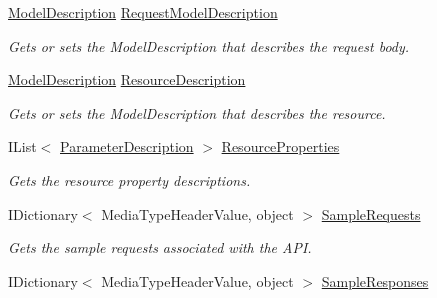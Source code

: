 \begin{DoxyCompactItemize}
\hyperlink{classApi3Layers_1_1Areas_1_1HelpPage_1_1ModelDescriptions_1_1ModelDescription}{Model\+Description} \hyperlink{classApi3Layers_1_1Areas_1_1HelpPage_1_1Models_1_1HelpPageApiModel_a014cdaab9901575d2ad288db94d49d49}{Request\+Model\+Description}
\begin{DoxyCompactList}\small\item\em Gets or sets the Model\+Description that describes the request body. \end{DoxyCompactList}\item 
\hyperlink{classApi3Layers_1_1Areas_1_1HelpPage_1_1ModelDescriptions_1_1ModelDescription}{Model\+Description} \hyperlink{classApi3Layers_1_1Areas_1_1HelpPage_1_1Models_1_1HelpPageApiModel_aac9145223442cf500f314efff3ba18a6}{Resource\+Description}
\begin{DoxyCompactList}\small\item\em Gets or sets the Model\+Description that describes the resource. \end{DoxyCompactList}\item 
I\+List$<$ \hyperlink{classApi3Layers_1_1Areas_1_1HelpPage_1_1ModelDescriptions_1_1ParameterDescription}{Parameter\+Description} $>$ \hyperlink{classApi3Layers_1_1Areas_1_1HelpPage_1_1Models_1_1HelpPageApiModel_aa66bf0e93d9891ddd4d05c986f886475}{Resource\+Properties}
\begin{DoxyCompactList}\small\item\em Gets the resource property descriptions. \end{DoxyCompactList}\item 
I\+Dictionary$<$ Media\+Type\+Header\+Value, object $>$ \hyperlink{classApi3Layers_1_1Areas_1_1HelpPage_1_1Models_1_1HelpPageApiModel_af027805b3af135bd56af841959479958}{Sample\+Requests}
\begin{DoxyCompactList}\small\item\em Gets the sample requests associated with the A\+PI. \end{DoxyCompactList}\item 
I\+Dictionary$<$ Media\+Type\+Header\+Value, object $>$ \hyperlink{classApi3Layers_1_1Areas_1_1HelpPage_1_1Models_1_1HelpPageApiModel_a4d0e8d9e76b2cc139ae6c1c0ba205f92}{Sample\+Responses}

\end{DoxyCompactItemize}
